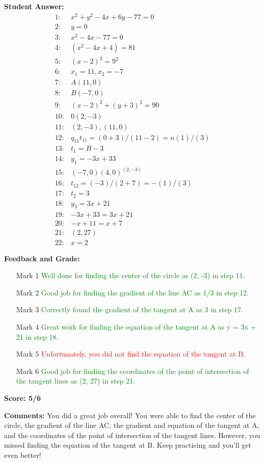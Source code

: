 \documentclass{article}
\begin{document}
\textbf{Student Answer:}
\begin{align*}
1: & x^{2}+y^{2}-4x+6y-77=0 \\
2: & y=0 \\
3: & x^{2}-4x-77=0 \\
4: & (x^{2}-4x+4)=81 \\
5: & (x-2)^{2}=9^{2} \\
6: & x_1=11, x_2=-7 \\
7: & A(11, 0) \\
8: & B(-7, 0) \\
9: & (x-2)^{2}+(y+3)^{2}=90 \\
10: & 0(2,-3) \\
11: & (2,-3),(11,0) \\
12: & q_{11}t_{11}=(0+3)/(11-2)=n(1)/(3) \\
13: & t_1=B-3 \\
14: & y_1=-3x+33 \\
15: & (-7,0)(4,0)^{(2,-3)} \\
16: & t_{12}= (-3)/(2+7)=-(1)/(3) \\
17: & t_2=3 \\
18: & y_3=3x+21 \\
19: & -3x+33=3x+21 \\
20: & -x+11=x+7 \\
21: & (2, 27) \\
22: & x=2
\end{align*}

\textbf{Feedback and Grade:}
\begin{itemize}
\item[Mark 1] \textcolor{green}{Well done for finding the center of the circle as (2, -3) in step 11.}
\item[Mark 2] \textcolor{green}{Good job for finding the gradient of the line AC as 1/3 in step 12.}
\item[Mark 3] \textcolor{green}{Correctly found the gradient of the tangent at A as 3 in step 17.}
\item[Mark 4] \textcolor{green}{Great work for finding the equation of the tangent at A as y = 3x + 21 in step 18.}
\item[Mark 5] \textcolor{red}{Unfortunately, you did not find the equation of the tangent at B.}
\item[Mark 6] \textcolor{green}{Good job for finding the coordinates of the point of intersection of the tangent lines as (2, 27) in step 21.}
\end{itemize}

\textbf{Score: 5/6}

\textbf{Comments:} You did a great job overall! You were able to find the center of the circle, the gradient of the line AC, the gradient and equation of the tangent at A, and the coordinates of the point of intersection of the tangent lines. However, you missed finding the equation of the tangent at B. Keep practicing and you'll get even better!
\end{document}
